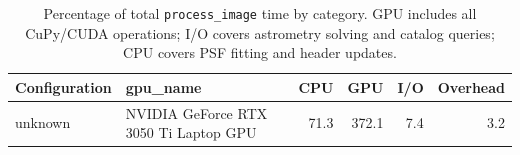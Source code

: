 \begin{table}
\caption{Percentage of total \texttt{process\_image} time by category. GPU includes all CuPy/CUDA operations; I/O covers astrometry solving and catalog queries; CPU covers PSF fitting and header updates.}
\label{tab:profiling_category}
\begin{tabular}{llrrrr}
\toprule
Configuration & gpu_name & CPU & GPU & I/O & Overhead \\
\midrule
unknown & NVIDIA GeForce RTX 3050 Ti Laptop GPU & 71.3 & 372.1 & 7.4 & 3.2 \\
\bottomrule
\end{tabular}
\end{table}
